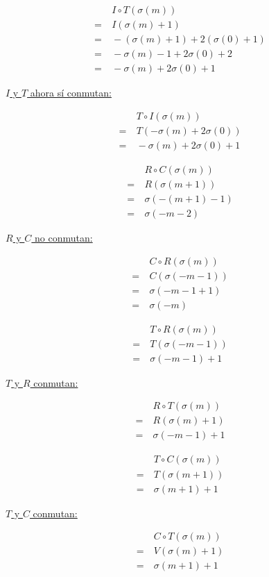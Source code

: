 		\begin{multicols}{3}
			\begin{align*}
			&\ I\circ T(\sigma(m))\\
			=&\ I(\sigma(m)+1)\\
			=&\ -(\sigma(m)+1) + 2(\sigma(0)+1)\\
			=&\ -\sigma(m)-1+2\sigma(0)+2\\
			=&\ -\sigma(m)+2\sigma(0)+1
			\end{align*}
			
			\underline{$I$ y $T$ ahora s\'i conmutan:}\\\columnbreak
			
			\begin{align*}
			&\ T\circ I(\sigma(m))\\
			=&\ T(-\sigma(m)+2\sigma(0))\\
			=&\ -\sigma(m)+2\sigma(0)+1
			\end{align*}
		\end{multicols}
		
		\begin{multicols}{3}
		\begin{align*}
		&\ R\circ C(\sigma(m))\\
		=&\ R(\sigma(m+1))\\
		=&\ \sigma(-(m+1)-1)\\
		=&\ \sigma(-m-2)
		\end{align*}
		
		\underline{$R$ y $C$ no conmutan:}
		
		\begin{align*}
		&\ C\circ R(\sigma(m))\\
		=&\ C(\sigma(-m-1))\\
		=&\ \sigma(-m-1+1)\\
		=&\ \sigma(-m)
		\end{align*}
		\end{multicols}
		
		\begin{multicols}{3}
			\begin{align*}
			&\ T\circ R(\sigma(m))\\
			=&\ T(\sigma(-m-1))\\
			=&\ \sigma(-m-1)+1
			\end{align*}
			
			\underline{$T$ y $R$ conmutan:}
			
			\begin{align*}
			&\ R\circ T(\sigma(m))\\
			=&\ R(\sigma(m)+1)\\
			=&\ \sigma(-m-1)+1
			\end{align*}
		\end{multicols}
	
		\begin{multicols}{3}
			\begin{align*}
			&\ T\circ C(\sigma(m))\\
			=&\ T(\sigma(m+1))\\
			=&\ \sigma(m+1)+1
			\end{align*}
			
			\underline{$T$ y $C$ conmutan:}
			
			\begin{align*}
			&\ C\circ T(\sigma(m))\\
			=&\ V(\sigma(m)+1)\\
			=&\ \sigma(m+1)+1
			\end{align*}
		\end{multicols}